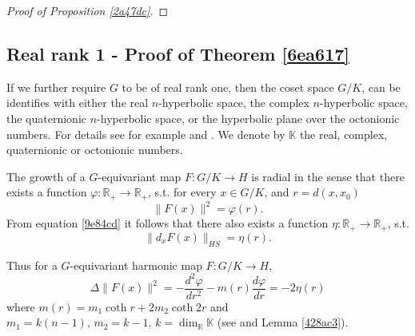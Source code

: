 \documentclass[12pt]{amsart}
\theoremstyle{definition}
\begin{document}
\begin{proof}[Proof of Proposition \ref{2a47dc}]
\end{proof}


\subsection{Real rank 1 - Proof of Theorem \ref{6ea617}}
\label{sec:real_rank_1_proof_of_theorem_ref6ea617}

If we further require \(G\) to be of real rank one, then the coset space
\(G/K\), can be identifies with either the real \(n\)-hyperbolic space,
the complex \(n\)-hyperbolic space, the quaternionic \(n\)-hyperbolic
space, or the hyperbolic plane over the octonionic numbers. For details
see for example \cite[Theorem~6.105]{Knapp2002} and
\cite[Chapter~3]{Cherix2001}. We denote by \(\mathbb{K}\) the real,
complex, quaternionic or octonionic numbers.


The growth of a \(G\)-equivariant map \(F: G/K \to H\) is radial in the
sense that there exists a function
\(\varphi: \mathbb{R}_{+} \to \mathbb{R}_{+}\), s.t. for every
\(x \in G/K\), and \(r = d(x,x_{0})\) \[\|F(x)\|^{2} = \varphi(r).\]
From equation \ref{9e84cd} it follows that there also exists a function
\(\eta: \mathbb{R}_{+} \to \mathbb{R}_{+}\), s.t.
\[\|d_{x}F(x)\|_{HS} = \eta(r).\]


Thus for a \(G\)-equivariant harmonic map \(F: G/K \to H\),
\[\Delta \|F(x)\|^{2}=-\frac{d^2 \varphi}{d r^2}-m(r) \frac{d \varphi}{d r} = -2\eta(r)\]
where \(m(r)=m_1 \operatorname{coth} r+2 m_2 \operatorname{coth} 2 r\)
and
\(m_1=k(n-1), \, m_2=k-1, \, k=\operatorname{dim}_{\mathbb{R}} \mathbb{K}\)
(see \cite[Chapter~II,~Section~3]{Helgason1984} and Lemma \ref{428ac3}).
\end{document}
